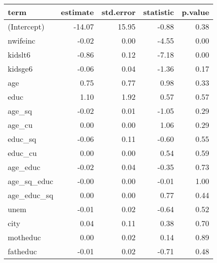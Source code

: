 \begin{tabular}{lrrrr}
  \hline
term & estimate & std.error & statistic & p.value \\ 
  \hline
(Intercept) & -14.07 & 15.95 & -0.88 & 0.38 \\ 
  nwifeinc & -0.02 & 0.00 & -4.55 & 0.00 \\ 
  kidslt6 & -0.86 & 0.12 & -7.18 & 0.00 \\ 
  kidsge6 & -0.06 & 0.04 & -1.36 & 0.17 \\ 
  age & 0.75 & 0.77 & 0.98 & 0.33 \\ 
  educ & 1.10 & 1.92 & 0.57 & 0.57 \\ 
  age\_sq & -0.02 & 0.01 & -1.05 & 0.29 \\ 
  age\_cu & 0.00 & 0.00 & 1.06 & 0.29 \\ 
  educ\_sq & -0.06 & 0.11 & -0.60 & 0.55 \\ 
  educ\_cu & 0.00 & 0.00 & 0.54 & 0.59 \\ 
  age\_educ & -0.02 & 0.04 & -0.35 & 0.73 \\ 
  age\_sq\_educ & -0.00 & 0.00 & -0.01 & 1.00 \\ 
  age\_educ\_sq & 0.00 & 0.00 & 0.77 & 0.44 \\ 
  unem & -0.01 & 0.02 & -0.64 & 0.52 \\ 
  city & 0.04 & 0.11 & 0.38 & 0.70 \\ 
  motheduc & 0.00 & 0.02 & 0.14 & 0.89 \\ 
  fatheduc & -0.01 & 0.02 & -0.71 & 0.48 \\ 
   \hline
\end{tabular}
